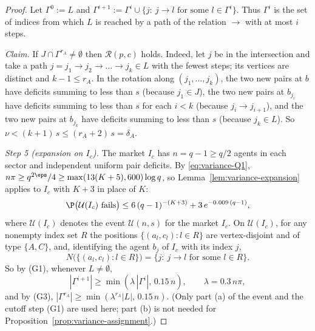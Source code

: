 \begin{proof}
Let $\Gamma^0:=L$ and $\Gamma^{i+1}:=\Gamma^i\cup\{j:\ j\to l\text{ for some }
l\in\Gamma^i\}$. Thus $\Gamma^i$ is the set of indices from which $L$ is reached by a path
of the relation $\to$ with at most $i$ steps.

\emph{Claim.} If $J\cap\Gamma^{r_A}\ne\emptyset$ then $\mathcal R(p,c)$ holds. Indeed, let
$j$ be in the intersection and take a path $j=j_1\to j_2\to\dots\to j_k\in L$ with the
fewest steps; its vertices are distinct and $k-1\le r_A$. In the rotation along
$(j_1,\dots,j_k)$, the two new pairs at $b$ have deficits summing to less than $s$
(because $j_1\in J$), the two new pairs at $b_{j_i}$ have deficits summing to less than
$s$ for each $i<k$ (because $j_i\to j_{i+1}$), and the two new pairs at $b_{j_k}$ have
deficits summing to less than $s$ (because $j_k\in L$). So
$\nu<(k+1)\,s\le(r_A+2)\,s=\delta_A$.

\emph{Step 5 (expansion on $I_c$).} The market $I_c$ has $n=q-1\ge q/2$ agents in each
sector and independent uniform pair deficits. By \eqref{eq:variance-Q1},
$n\pi\ge q^{2\eps}/4\ge\max(13(K+5),600)\log q$, so Lemma~\ref{lem:variance-expansion}
applies to $I_c$ with $K+3$ in place of $K$:
\[
\P\bigl(\mathcal U(I_c)\text{ fails}\bigr)\le6\,(q-1)^{-(K+3)}+3\,e^{-0.009\,(q-1)},
\]
where $\mathcal U(I_c)$ denotes the event $\mathcal U(n,s)$ for the market $I_c$. On
$\mathcal U(I_c)$, for any nonempty index set $R$ the positions
$\{(a_l,c_l):l\in R\}$ are vertex-disjoint and of type $\{A,C\}$, and, identifying the
agent $b_j$ of $I_c$ with its index $j$,
\[
N\bigl(\{(a_l,c_l):l\in R\}\bigr)=\{j:\ j\to l\text{ for some }l\in R\}.
\]
So by (G1), whenever $L\ne\emptyset$,
\[
|\Gamma^{i+1}|\ge\min(\lambda\,|\Gamma^i|,\,0.15\,n),\qquad\lambda=0.3\,n\pi,
\]
and by (G3), $|\Gamma^{r_A}|\ge\min(\lambda^{r_A}|L|,\,0.15\,n)$. (Only part (a) of the
event and the cutoff step (G1) are used here; part (b) is not needed for
Proposition~\ref{prop:variance-assignment}.)


\end{proof}
